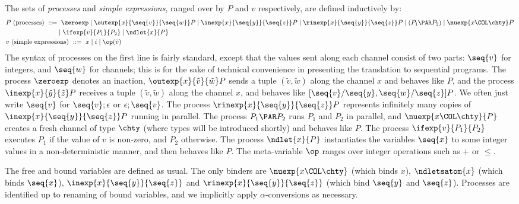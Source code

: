The sets of \emph{processes} and \emph{simple expressions},
ranged over by $P$ and $v$ respectively, are defined inductively
by: %
\begin{align*}
    &P \mbox{ (processes) }::= \ \zeroexp \mid \outexp{x}{\seq{v}}{\seq{w}}P \mid \inexp{x}{\seq{y}}{\seq{z}}P \mid \rinexp{x}{\seq{y}}{\seq{z}}P \mid (P_1 \PAR P_2) \mid \nuexp{x \COL \chty} P \\
    &\hphantom{P \mbox{ (processes) }::=}     \mid \ifexp{v}{P_1}{P_2} \mid \ndlet{x}{P} \\
    &v \mbox{ (simple expressions) }::= \ x \mid i \mid \op(\tilde{v})
\end{align*}
The syntax of processes on the first line is fairly standard, except that
the values sent along each channel consist of two parts: \(\seq{v}\) for integers,
and \(\seq{w}\) for channels; this is for the sake of technical convenience in
presenting the translation to sequential programs. The process \(\zeroexp\)
denotes an inaction, \(\outexp{x}{\tilde{v}}{\tilde{w}}P\) sends
a tuple \((\tilde{v},\tilde{w})\) along the channel \(x\) and behaves like \(P\),
and the process \(\inexp{x}{\tilde{y}}{\tilde{z}}P\) receives
a tuple \((\tilde{v},\tilde{w})\) along the channel \(x\), and behaves like
\([\seq{v}/\seq{y}, \seq{w}/\seq{z}]P\). We often just write \(\seq{v}\) for
\(\seq{v};\epsilon\) or \(\epsilon;\seq{v}\).
The process \(\rinexp{x}{\seq{y}}{\seq{z}}P\) represents infinitely many copies
of \(\inexp{x}{\seq{y}}{\seq{z}}P\) running in parallel.
The process \(P_1\PAR P_2\) runs \(P_1\) and \(P_2\) in parallel,
and \(\nuexp{x\COL\chty}{P}\) creates a fresh channel  of type \(\chty\) (where types
will be introduced shortly) and behaves like \(P\).
The process \(\ifexp{v}{P_1}{P_2}\) executes \(P_1\) if the value of \(v \) is
non-zero, and \(P_2\) otherwise.
The process \(\ndlet{x}{P}\) instantiates the variables \(\seq{x}\) to
some integer values in a non-deterministic manner, and then behaves like \(P\).
The meta-variable \( \op \) ranges over integer operations such as \( + \) or \( \le \).


The free and bound variables are defined as usual.
The only binders are \(\nuexp{x\COL\chty}\)
(which binds \(x\)), \(\ndletsatom{x}\) (which binds \(\seq{x}\)),
\(\inexp{x}{\seq{y}}{\seq{z}}\)
and \(\rinexp{x}{\seq{y}}{\seq{z}}\) (which bind \(\seq{y}\) and \(\seq{z}\)).
Processes are identified up to renaming of bound variables,
and we implicitly apply \( \alpha \)-conversions as necessary.

